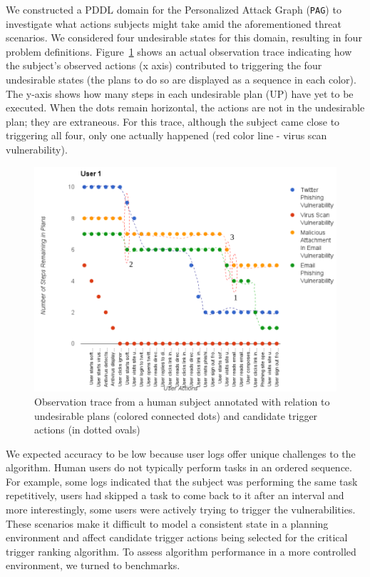We constructed a PDDL domain for the Personalized Attack Graph (\texttt{PAG}) to investigate what actions subjects might take amid the aforementioned threat scenarios.  We considered four undesirable states for this domain, resulting in four problem definitions. Figure~\ref{fig:trace} shows an actual observation trace indicating how the subject's observed actions (x axis) contributed to triggering the four undesirable states (the plans to do so are displayed as a sequence in each color). The y-axis shows how many steps in each undesirable plan (UP) have yet to be executed. When the dots remain horizontal, the actions are not in the undesirable plan; they are extraneous. For this trace, although the subject came close to triggering all four, only one actually happened (red color line - virus scan vulnerability). 

\begin{figure}[tpb]
 \centerline{\includegraphics[width=\columnwidth, keepaspectratio=true]{img/user-study.png}}
 \caption{Observation trace from a human subject annotated with relation to undesirable plans (colored connected dots) and candidate trigger actions (in dotted ovals)}
 \label{fig:trace}
\end{figure}

We expected accuracy to be low because user logs offer unique challenges to the algorithm. Human users do not typically perform tasks in an ordered sequence. For example, some logs indicated that the subject was performing the same task repetitively, users had skipped a task to come back to it after an interval and more interestingly, some users were actively trying to trigger the vulnerabilities. These scenarios make it difficult to model a consistent state in a planning environment and affect candidate trigger actions being selected for the critical trigger ranking algorithm. To assess algorithm performance in a more controlled environment, we turned to benchmarks.


